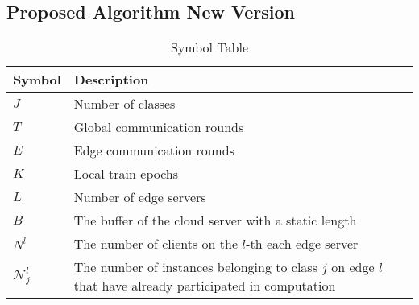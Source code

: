 \documentclass[journal]{IEEEtran}
\begin{document}
\subsection{Proposed Algorithm New Version}
\begin{table}[H]
  \caption{Symbol Table}
  \centering
  \renewcommand{\arraystretch}{1.2}
  \begin{tabular}{|@{}m{1cm}<{\centering}|m{6.5cm}|}
    \hline
    \textbf{Symbol}                       & \textbf{Description}                                                                                                                  \\
    \hline
    \( J \)                               & Number of classes                                                                                                                     \\
    \hline
    \( T \)                               & Global communication rounds                                                                                                                         \\
    \hline
     \( E \)                               & Edge communication rounds                                                                                                                           \\
    \hline
     \( K \)                               & Local train epochs                                                                                                                          \\
    \hline
     \( L \)                               & Number of edge servers                                                                                                                \\
    \hline
     \( B \)                               & The buffer of the cloud server with a static length                                                                                   \\
    \hline
     \( N^l \)                             & The number of clients on the $l$-th each edge server                                                                                      \\
    \hline
    \(\mathcal{N}_j^l\) & The number of instances belonging to class \( j \) on edge \( l \) that have already participated in computation                                           \\
    \hline

\end{tabular}
\end{table}
\end{document}
